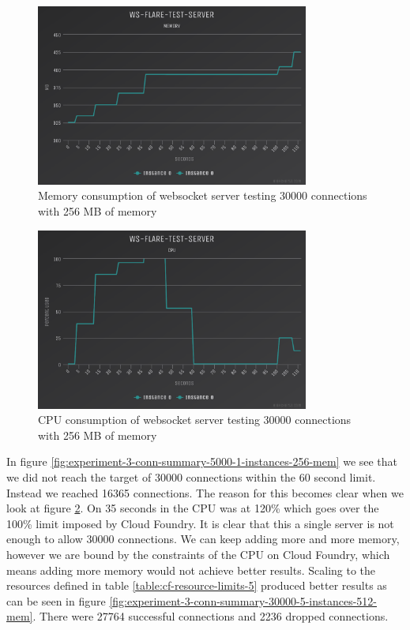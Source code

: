 \begin{figure}[H]
  \centering
    \includegraphics[width=0.8\textwidth]{figures/experiments/experiment-1/node-js/memory-30000-256-memory.png}
    \caption{Memory consumption of websocket server testing 30000 connections with 256 MB of memory}
    \label{fig:experiment-3-memory-5000-1-instances-256-mem}
\end{figure}

\begin{figure}[H]
  \centering
    \includegraphics[width=0.8\textwidth]{figures/experiments/experiment-1/node-js/cpu-30000-256-memory.png}
    \caption{CPU consumption of websocket server testing 30000 connections with 256 MB of memory}
    \label{fig:experiment-3-cpu-5000-1-instances-256-mem}
\end{figure}

In figure \ref{fig:experiment-3-conn-summary-5000-1-instances-256-mem} we see that we did not reach the target of 30000 connections within the 60 second limit. Instead we reached 16365 connections. The reason for this becomes clear when we look at figure  \ref{fig:experiment-3-cpu-5000-1-instances-256-mem}. On 35 seconds in the CPU was at 120\% which goes over the 100\% limit imposed by Cloud Foundry. It is clear that this a single server is not enough to allow 30000 connections. We can keep adding more and more memory, however we are bound by the constraints of the CPU on Cloud Foundry, which means adding more memory would not achieve better results. Scaling to the resources defined in table \ref{table:cf-resource-limits-5} produced better results as can be seen in figure \ref{fig:experiment-3-conn-summary-30000-5-instances-512-mem}. There were 27764 successful connections and 2236 dropped connections.

